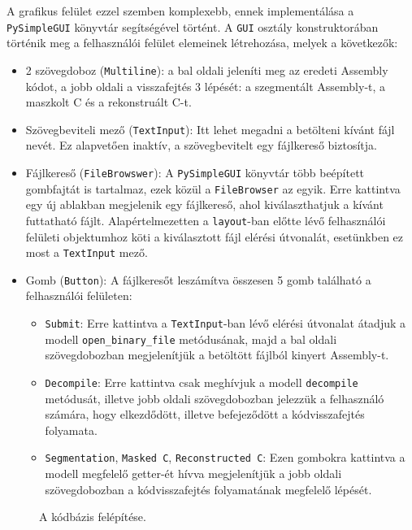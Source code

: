 A grafikus felület ezzel szemben komplexebb, ennek implementálása a
\texttt{PySimpleGUI}\cite{pysimplegui} könyvtár segítségével történt.
A \texttt{GUI} osztály konstruktorában történik meg a felhasználói felület
elemeinek létrehozása, melyek a következők:
\begin{itemize}
    \item 2 szövegdoboz (\texttt{Multiline}): a bal oldali jeleníti meg az
    eredeti Assembly kódot, a jobb oldali a visszafejtés 3 lépését:
    a szegmentált Assembly-t, a maszkolt C és a rekonstruált C-t.
    \item Szövegbeviteli mező (\texttt{TextInput}): Itt lehet megadni
    a betölteni kívánt fájl nevét. Ez alapvetően inaktív, a szövegbevitelt egy
    fájlkereső biztosítja.
    \item Fájlkereső (\texttt{FileBrowswer}): A \texttt{PySimpleGUI} könyvtár több beépített gombfajtát is tartalmaz,
        ezek közül a \texttt{FileBrowser} az egyik. Erre kattintva egy új ablakban megjelenik egy fájlkereső, ahol
        kiválaszthatjuk a kívánt futtatható fájlt. Alapértelmezetten a \texttt{layout}-ban előtte lévő felhasználói
        felületi objektumhoz köti a kiválasztott fájl elérési útvonalát, esetünkben ez most a \texttt{TextInput}
        mező.
    \item Gomb (\texttt{Button}): A fájlkeresőt leszámítva összesen 5 gomb található a felhasználói felületen:
    \begin{itemize}
        \item \texttt{Submit}: Erre kattintva a \texttt{TextInput}-ban lévő elérési útvonalat átadjuk a modell
            \texttt{open\_binary\_file} metódusának, majd a bal oldali szövegdobozban megjelenítjük a betöltött
            fájlból kinyert Assembly-t.
        \item \texttt{Decompile}: Erre kattintva csak meghívjuk a modell \texttt{decompile} metódusát, illetve
            jobb oldali szövegdobozban jelezzük a felhasználó számára, hogy elkezdődött, illetve befejeződött
            a kódvisszafejtés folyamata.
        \item \texttt{Segmentation}, \texttt{Masked C}, \texttt{Reconstructed C}: Ezen gombokra kattintva a modell
            megfelelő getter-ét hívva megjelenítjük a jobb oldali szövegdobozban a kódvisszafejtés folyamatának
            megfelelő lépését.
    \end{itemize}
\end{itemize}

\begin{figure}[H]
	\centering
	
	\caption{A kódbázis felépítése.}
	\label{fig:file-system}
\end{figure}

